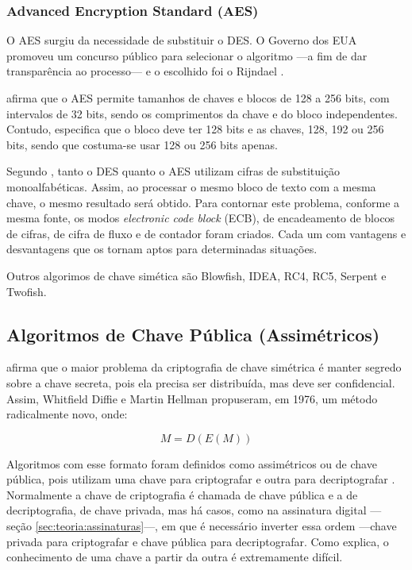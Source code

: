 \documentclass[12px,a4paper,twoside]{article}
\begin{document}
\subsubsection{Advanced Encryption Standard (AES)}
\label{sec:teoria:simetricos:aes}
O AES surgiu da necessidade de substituir o DES.  O Governo dos EUA promoveu um
concurso público para selecionar o algoritmo ---a fim de dar transparência ao
processo--- e o escolhido foi o Rijndael \cite{tanenbaum}.

\cite{tanenbaum} afirma que o AES permite tamanhos de chaves e blocos de 128 a
256 bits, com intervalos de 32 bits, sendo os comprimentos da chave e do bloco
independentes.  Contudo, especifica que o bloco deve ter 128 bits e as chaves,
128, 192 ou 256 bits, sendo que costuma-se usar 128 ou 256 bits apenas.

Segundo \cite{tanenbaum}, tanto o DES quanto o AES utilizam cifras de
substituição monoalfabéticas. Assim, ao processar o mesmo bloco de texto com a
mesma chave, o mesmo resultado será obtido.  Para contornar este problema,
conforme a mesma fonte, os modos \textit{electronic code block} (ECB), de
encadeamento de blocos de cifras, de cifra de fluxo e de contador foram
criados. Cada um com vantagens e desvantagens que os tornam aptos para
determinadas situações.

Outros algorimos de chave simética são Blowfish, IDEA, RC4, RC5, Serpent e
Twofish.

\subsection{Algoritmos de Chave Pública (Assimétricos)}
\label{sec:teoria:assimetricos}
\cite{tanenbaum} afirma que o maior problema da criptografia de chave simétrica
é manter segredo sobre a chave secreta, pois ela precisa ser distribuída, mas
deve ser confidencial.  Assim, Whitfield Diffie e Martin Hellman propuseram, em
1976, um método radicalmente novo, onde:

\begin{equation}
M = D(E(M))
\end{equation}

Algoritmos com esse formato foram definidos como assimétricos ou de chave
pública, pois utilizam uma chave para criptografar e outra para decriptografar
\cite{uchoa}.  Normalmente a chave de criptografia é chamada de chave pública e
a de decriptografia, de chave privada, mas há casos, como na assinatura digital
---seção \ref{sec:teoria:assinaturas}---, em que é necessário inverter essa
ordem ---chave privada para criptografar e chave pública para decriptografar.
Como \cite{tanenbaum} explica, o conhecimento de uma chave a partir da outra é
extremamente difícil.
\end{document}
